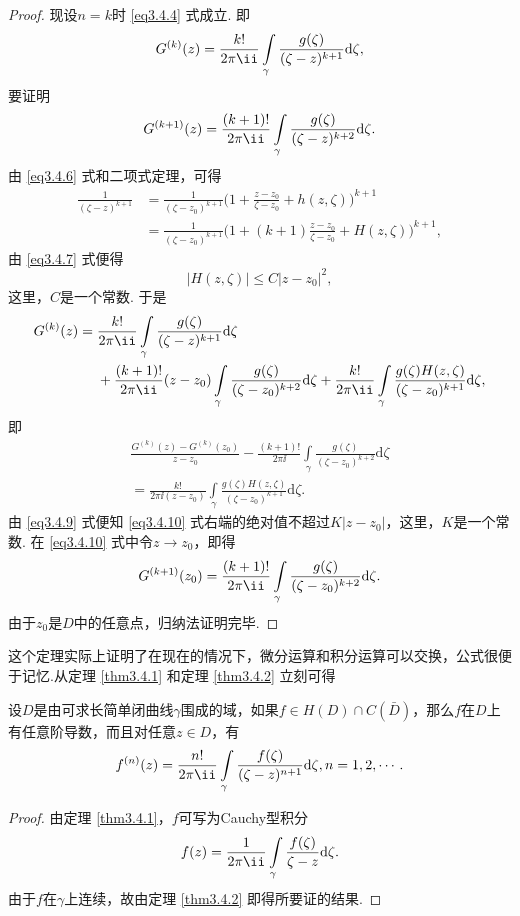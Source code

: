 \begin{proof}
现设$n=k$时 \eqref{eq3.4.4} 式成立. 即
\[ G^{(k)}(z)=\frac{k!}{2\pi\ii}\int\limits_\gamma\frac{g(\zeta)}{(\zeta-z)^{k+1}}\textrm d\zeta,
\]
要证明
\[ G^{(k+1)}(z)=\frac{(k+1)!}{2\pi\ii}\int\limits_\gamma\frac{g(\zeta)}{(\zeta-z)^{k+2}}\textrm d\zeta.
\]
由 \eqref{eq3.4.6} 式和二项式定理，可得
\begin{align*}
\frac{1}{( \zeta -z) ^{k+1}}&=\frac{1}{( \zeta -z_0 ) ^{k+1}}\bigg( 1+\frac{z-z_0}{\zeta -z_0}+h( z,\zeta ) \bigg) ^{k+1}\\
&=\frac{1}{( \zeta -z_0 ) ^{k+1}}\bigg( 1+(k+1)\frac{z-z_0}{\zeta -z_0}+H( z,\zeta ) \bigg) ^{k+1},
\end{align*}
由 \eqref{eq3.4.7} 式便得
\begin{equation}\label{eq3.4.9}
  |H(z,\zeta)|\le C|z-z_0|^2,
\end{equation}
这里，$C$是一个常数. 于是
\begin{align*}
G^{(k)}(z)={}&\frac{k!}{2\pi\ii}\int\limits_\gamma\frac{g(\zeta)}{(\zeta-z)^{k+1}}\textrm d\zeta\\
&+\frac{(k+1)!}{2\pi\ii}(z-z_0)\int\limits_\gamma\frac{g(\zeta)}{(\zeta-z_0)^{k+2}}
\textrm d\zeta+\frac{k!}{2\pi\ii}\int\limits_\gamma\frac{g(\zeta)H(z,\zeta)}{(\zeta-z_0)^{k+1}}
\textrm d\zeta,
\end{align*}
即
\begin{equation}\label{eq3.4.10}
\begin{gathered}
  \frac{G^{( k )}( z ) -G^{( k )}( z_0 )}{z-z_0}-\frac{( k+1 ) !}{2\pi\ii}\int\limits_{\gamma}{\frac{g( \zeta )}{( \zeta -z_0 ) ^{k+2}}\text{d}\zeta}\\
  =\frac{k!}{2\pi\ii ( z-z_0 )}\int\limits_{\gamma}{\frac{g( \zeta ) H( z,\zeta )}{( \zeta -z_0 ) ^{k+1}}\text{d}\zeta}.
\end{gathered}
\end{equation}
由 \eqref{eq3.4.9} 式便知 \eqref{eq3.4.10} 式右端的绝对值不超过$K|z-z_0|$，这里，$K$是一个常数. 在 \eqref{eq3.4.10} 式中令$z\to z_0$，即得
\[ G^{(k+1)}(z_0)=\frac{(k+1)!}{2\pi\ii}\int\limits_\gamma\frac{g(\zeta)}{(\zeta-z_0)^{k+2}}\textrm d\zeta.
\]
由于$z_0$是$D$中的任意点，归纳法证明完毕.
\end{proof}

这个定理实际上证明了在现在的情况下，微分运算和积分运算可以交换，公式很便于记忆.从定理 \ref{thm3.4.1} 和定理 \ref{thm3.4.2} 立刻可得
\begin{theorem}\label{thm3.4.3}
设$D$是由可求长简单闭曲线$\gamma$围成的域，如果$f\in H(D)\cap C(\bar D)$，那么$f$在$D$上有任意阶导数，而且对任意$z\in D$，有
\begin{equation*}
  f^{(n)}(z)=\frac{n!}{2\pi\ii}\int\limits_\gamma\frac{f(\zeta)}{(\zeta-z)^{n+1}}\textrm d\zeta,n=1,2,\cdots.
\end{equation*}
\end{theorem}
\begin{proof}
由定理 \ref{thm3.4.1}，$f$可写为Cauchy型积分
\[f(z)=\frac1{2\pi\ii}\int\limits_{\gamma}\frac{f(\zeta)}{\zeta-z}\textrm d\zeta.\]
由于$f$在$\gamma$上连续，故由定理 \ref{thm3.4.2} 即得所要证的结果.
\end{proof}

